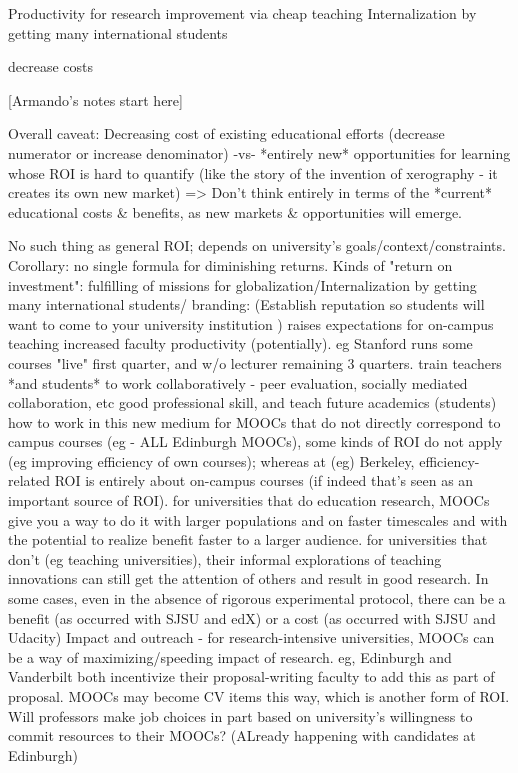 Productivity for research improvement via cheap teaching Internalization
by getting many international students

decrease costs


[Armando's notes start here]

Overall caveat: Decreasing cost of existing educational efforts
(decrease numerator or increase denominator)
-vs-
*entirely new* opportunities for learning whose ROI is hard to quantify
(like the story of the invention of xerography - it creates its own new
market) => Don't think entirely in terms of the *current* educational
costs \& benefits, as new markets \& opportunities will emerge.

No such thing as general ROI; depends on university's
goals/context/constraints. Corollary: no single formula for diminishing
returns.  Kinds of "return on investment": fulfilling of missions for
globalization/Internalization by getting many international students/
branding: (Establish reputation so students will want to come to your
university institution ) raises expectations for on-campus teaching
increased faculty productivity (potentially). eg Stanford runs some
courses "live" first quarter, and w/o lecturer remaining 3 quarters.
train teachers *and students* to work collaboratively - peer evaluation,
socially mediated collaboration, etc good professional skill, and teach
future academics (students) how to work in this new medium for MOOCs
that do not directly correspond to campus courses (eg - ALL Edinburgh
MOOCs), some kinds of ROI do not apply (eg improving efficiency of own
courses); whereas at (eg) Berkeley, efficiency-related ROI is entirely
about on-campus courses (if indeed that's seen as an important source of
ROI).  for universities that do education research, MOOCs give you a way
to do it with larger populations and on faster timescales and with the
potential to realize benefit faster to a larger audience.  for
universities that don't (eg teaching universities), their informal
explorations of teaching innovations can still get the attention of
others and result in good research.  In some cases, even in the absence
of rigorous experimental protocol, there can be a benefit (as occurred
with SJSU and edX) or a cost (as occurred with SJSU and Udacity) Impact
and outreach - for research-intensive universities, MOOCs can be a way
of maximizing/speeding impact of research.  eg, Edinburgh and Vanderbilt
both incentivize their proposal-writing faculty to add this as part of
proposal.  MOOCs may become CV items this way, which is another form of
ROI.  Will professors make job choices in part based on university's
willingness to commit resources to their MOOCs?  (ALready happening with
candidates at Edinburgh)


